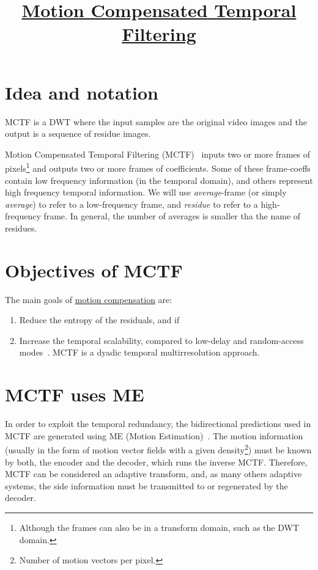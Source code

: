 
\title{\href{https://github.com/vicente-gonzalez-ruiz/MCTF}{Motion Compensated Temporal Filtering}}

\maketitle

\section{Idea and notation}

MCTF is a DWT where the input samples are the original video images
and the output is a sequence of residue images.

Motion Compensated Temporal Filtering (MCTF)~\cite{ohm1994three}
inputs two or more frames of pixels\footnote{Although the frames can
  also be in a transform domain, such as the DWT domain.} and outputs
two or more frames of coefficients. Some of these frame-coeffs contain
low frequency information (in the temporal domain), and others
represent high frequency temporal information. We will use
\emph{average}-frame (or simply \emph{average}) to refer to a
low-frequency frame, and \emph{residue} to refer to a high-frequency
frame. In general, the number of averages is smaller tha the name of
residues.


\section{Objectives of MCTF}

The main goals of
\href{https://en.wikipedia.org/wiki/Motion_compensation}{motion
  compensation} are:
\begin{enumerate}
\item Reduce the entropy of the residuals, and if
\item Increase the temporal scalability, compared to low-delay and
  random-access modes~\cite{vruiz__sistemas_multimedia}. MCTF is a
  dyadic temporal multirresolution approach.
\end{enumerate}
  

\section{MCTF uses ME}

In order to exploit the temporal redundancy, the bidirectional
predictions used in MCTF are generated using ME (Motion
Estimation)~\cite{vruiz__ME}. The motion information (usually in the
form of motion vector fields with a given density\footnote{Number of
  motion vectors per pixel.}) must be known by both, the encoder and
the decoder, which runs the inverse MCTF. Therefore, MCTF can be
considered an adaptive transform, and, as many others adaptive
systems, the side information must be transmitted to or regenerated by
the decoder.

